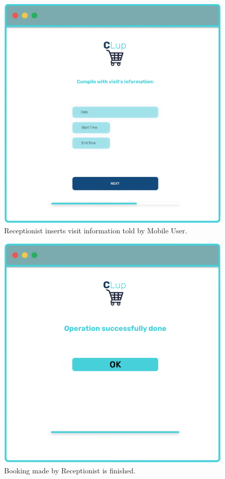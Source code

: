 \begin{figure}[H]
  \caption{Receptionist inserts visit information told by Mobile User.}
  \label{fig:Login}
  \centering
  \includegraphics[scale=0.31]{images/mockup/info_visit_rec.png}

\end{figure}

\begin{figure}[H]
  \caption{Booking made by Receptionist is finished.}
  \label{fig:Login}
  \centering
  \includegraphics[scale=0.25]{images/mockup/Done_Rec.png}

\end{figure}
\par
